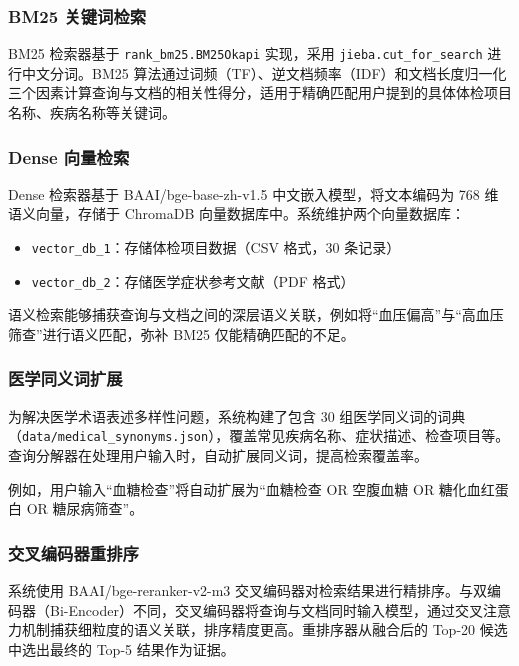 \documentclass[12pt,a4paper]{article}
\begin{document}
\subsubsection{BM25 关键词检索}

BM25 检索器基于 \texttt{rank\_bm25.BM25Okapi} 实现，采用 \texttt{jieba.cut\_for\_search} 进行中文分词。BM25 算法通过词频（TF）、逆文档频率（IDF）和文档长度归一化三个因素计算查询与文档的相关性得分，适用于精确匹配用户提到的具体体检项目名称、疾病名称等关键词。

\subsubsection{Dense 向量检索}

Dense 检索器基于 BAAI/bge-base-zh-v1.5 中文嵌入模型，将文本编码为 768 维语义向量，存储于 ChromaDB 向量数据库中。系统维护两个向量数据库：

\begin{itemize}[leftmargin=2em]
    \item \texttt{vector\_db\_1}：存储体检项目数据（CSV 格式，30 条记录）
    \item \texttt{vector\_db\_2}：存储医学症状参考文献（PDF 格式）
\end{itemize}

语义检索能够捕获查询与文档之间的深层语义关联，例如将“血压偏高”与“高血压筛查”进行语义匹配，弥补 BM25 仅能精确匹配的不足。

\subsubsection{医学同义词扩展}

为解决医学术语表述多样性问题，系统构建了包含 30 组医学同义词的词典（\texttt{data/medical\_synonyms.json}），覆盖常见疾病名称、症状描述、检查项目等。查询分解器在处理用户输入时，自动扩展同义词，提高检索覆盖率。

例如，用户输入“血糖检查”将自动扩展为“血糖检查 OR 空腹血糖 OR 糖化血红蛋白 OR 糖尿病筛查”。

\subsubsection{交叉编码器重排序}

系统使用 BAAI/bge-reranker-v2-m3 交叉编码器对检索结果进行精排序。与双编码器（Bi-Encoder）不同，交叉编码器将查询与文档同时输入模型，通过交叉注意力机制捕获细粒度的语义关联，排序精度更高。重排序器从融合后的 Top-20 候选中选出最终的 Top-5 结果作为证据。
\end{document}
